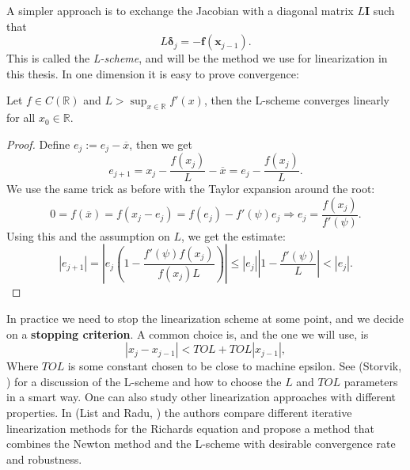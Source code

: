 \documentclass[../Main/main.tex]{subfiles}
\begin{document}
A simpler approach is to exchange the Jacobian with a diagonal matrix $L\pmb{I}$ such that 
\begin{equation}\label{eq:L-scheme}
	L\pmb{\delta}_j = - \pmb{f}(\pmb{x}_{j-1}).
\end{equation}
This is called the \emph{L-scheme}, and will be the  method we use for linearization in this thesis. In one dimension it is easy to prove convergence:

\begin{theorem}
	Let $f\in C(\mathbb{R})$ and $L>\sup_{x\in\mathbb{R}}f'(x)$, then the L-scheme converges linearly for all $x_0\in \mathbb{R}$.
\end{theorem}
\begin{proof}
	Define $e_j := e_j-\overline{x}$, then we get
	\begin{equation}
		e_{j+1} = x_j-\frac{f(x_j)}{L}-\overline{x}=e_j-\frac{f(x_j)}{L}.
	\end{equation}
	We use the same trick as before with the Taylor expansion around the root:
	\begin{equation}
		0 = f(\overline{x}) = f(x_j-e_j) = f(e_j)-f'(\psi)e_j\Rightarrow e_j = \frac{f(x_j)}{f'(\psi)}.
	\end{equation}
	Using this and the assumption on $L$, we get the estimate:
	\begin{equation}
		|e_{j+1}|=|e_j(1-\frac{f'(\psi)f(x_j)}{f(x_j)L})|\leq|e_j||1-\frac{f'(\psi)}{L}|<|e_j|.
	\end{equation}
\end{proof}
In practice we need to stop the linearization scheme at some point, and we decide on a \textbf{stopping criterion}. A common choice is, and the one we will use, is
\begin{equation}\label{eq:stopping_criterion}
	|x_{j}-x_{j-1}|<TOL+TOL|x_{j-1}|,
\end{equation}
Where $TOL$ is some constant chosen to be close to machine epsilon. See (Storvik, \cite{Erlend}) for a discussion of the L-scheme and how to choose the $L$ and $TOL$ parameters in a smart way. One can also study other linearization approaches with different properties. In (List and Radu, \cite{list2016study}) the authors compare different iterative linearization methods for the Richards equation and propose a method that combines the Newton method and the L-scheme with desirable convergence rate and robustness. 
\end{document}
